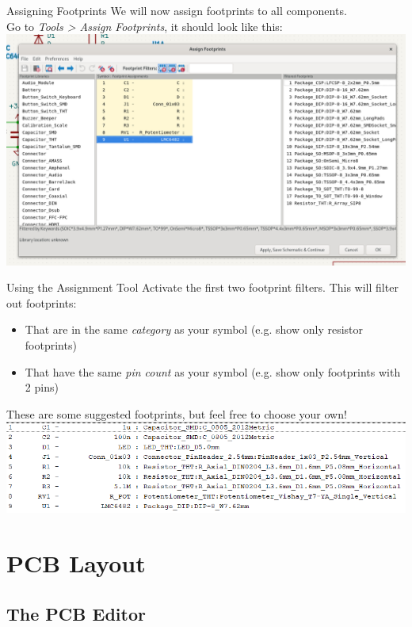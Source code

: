 \documentclass{beamer}
\begin{document}
\begin{frame}{Assigning Footprints}
  We will now assign footprints to all components.\\
  Go to \textit{Tools > Assign Footprints}, it should look like this:\\
  \includegraphics[width=\textwidth]{images/footprint-menu.png}
\end{frame}

\begin{frame}{Using the Assignment Tool}
  Activate the first two footprint filters. This will filter out footprints:
  \begin{itemize}
    \item That are in the same \textit{category} as your symbol (e.g. show only resistor footprints)
    \item That have the same \textit{pin count} as your symbol (e.g. show only footprints with 2 pins)
  \end{itemize}
  \pause
  These are some suggested footprints, but feel free to choose your own!
  \includegraphics[width=\textwidth]{images/footprint-selection.png}
\end{frame}

\section{PCB Layout}

\subsection{The PCB Editor}
\end{document}
